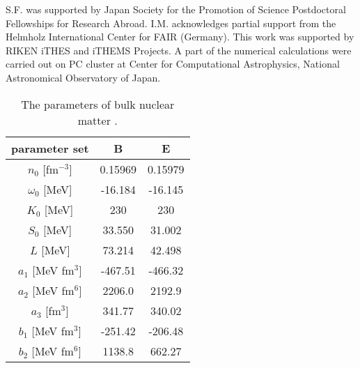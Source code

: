 \documentclass[preprint]{revtex4}
\begin{document}
{{{\begin{acknowledgments}
S.F.  was supported by Japan Society for the Promotion of
Science Postdoctoral Fellowships for Research Abroad. %
I.M. acknowledges partial support from the Helmholz International Center for FAIR (Germany).
This work was supported by RIKEN iTHES and iTHEMS Projects.
A part of the numerical calculations were carried out on  PC cluster at Center
for Computational Astrophysics, National Astronomical Observatory of Japan.
\end{acknowledgments}



\newpage

\begin{table}[t]
\begin{tabular}{|c||c|c|}
\hline 
\hline
 parameter set  & B & E  \\
 \hline
  $n_{0}$ [fm$^{-3}$]  &  0.15969 &  0.15979 \\
 $\omega_0$ [MeV] &-16.184  &   -16.145 \\
 $K_0$ [MeV] & 230   &  230          \\
 $S_0$ [MeV]  & 33.550 &   31.002  \\
 $L$ [MeV] & 73.214  & 42.498 \\
\hline
$a_1$  [MeV fm$^3$]  & -467.51 & -466.32 \\
$a_2$  [MeV fm$^6$] & 2206.0 & 2192.9  \\
$a_3$ [fm$^3$] & 341.77 & 340.02 \\
$b_1$  [MeV fm$^3$]  & -251.42 & -206.48 \\
$b_2$  [MeV fm$^6$]  & 1138.8 & 662.27  \\
 \hline
\hline
\end{tabular}
\caption{\label{tab1_bulk}%
The parameters of bulk nuclear matter \cite{oyamatsu03,oyamatsu07}.} 
\end{table}


}}}
\end{document}
